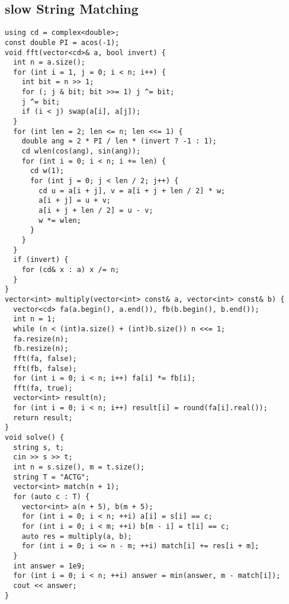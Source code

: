 \documentclass[twoside]{article}
\begin{document}
\begin{multicols*}{2}
{\subsection*{slow String Matching}
}
\begin{verbatim}
using cd = complex<double>;
const double PI = acos(-1);
void fft(vector<cd>& a, bool invert) {
  int n = a.size();
  for (int i = 1, j = 0; i < n; i++) {
    int bit = n >> 1;
    for (; j & bit; bit >>= 1) j ^= bit;
    j ^= bit;
    if (i < j) swap(a[i], a[j]);
  }
  for (int len = 2; len <= n; len <<= 1) {
    double ang = 2 * PI / len * (invert ? -1 : 1);
    cd wlen(cos(ang), sin(ang));
    for (int i = 0; i < n; i += len) {
      cd w(1);
      for (int j = 0; j < len / 2; j++) {
        cd u = a[i + j], v = a[i + j + len / 2] * w;
        a[i + j] = u + v;
        a[i + j + len / 2] = u - v;
        w *= wlen;
      }
    }
  }
  if (invert) {
    for (cd& x : a) x /= n;
  }
}
vector<int> multiply(vector<int> const& a, vector<int> const& b) {
  vector<cd> fa(a.begin(), a.end()), fb(b.begin(), b.end());
  int n = 1;
  while (n < (int)a.size() + (int)b.size()) n <<= 1;
  fa.resize(n);
  fb.resize(n);
  fft(fa, false);
  fft(fb, false);
  for (int i = 0; i < n; i++) fa[i] *= fb[i];
  fft(fa, true);
  vector<int> result(n);
  for (int i = 0; i < n; i++) result[i] = round(fa[i].real());
  return result;
}
void solve() {
  string s, t;
  cin >> s >> t;
  int n = s.size(), m = t.size();
  string T = "ACTG";
  vector<int> match(n + 1);
  for (auto c : T) {
    vector<int> a(n + 5), b(m + 5);
    for (int i = 0; i < n; ++i) a[i] = s[i] == c;
    for (int i = 0; i < m; ++i) b[m - i] = t[i] == c;
    auto res = multiply(a, b);
    for (int i = 0; i <= n - m; ++i) match[i] += res[i + m];
  }
  int answer = 1e9;
  for (int i = 0; i < n; ++i) answer = min(answer, m - match[i]);
  cout << answer;
}
\end{verbatim}

{
}
\end{multicols*}
\end{document}
